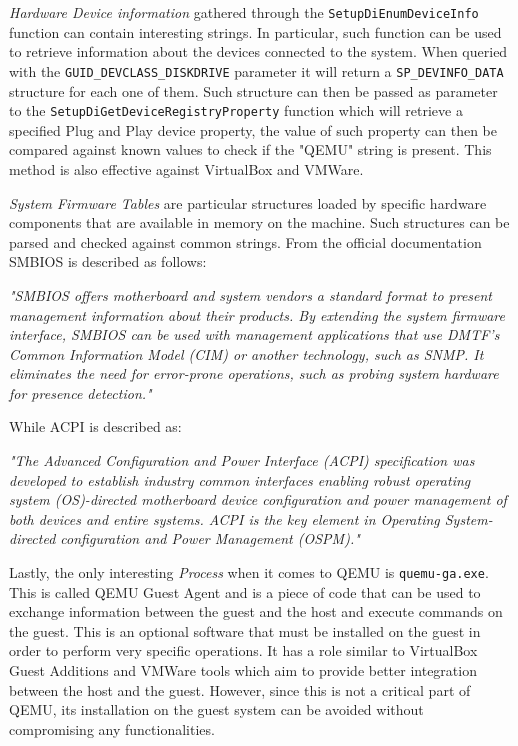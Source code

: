 \textit{Hardware Device information} gathered through the \lstinline{SetupDiEnumDeviceInfo} function can contain interesting strings. In particular, such function can be used to retrieve information about the devices connected to the system. When queried with the \lstinline{GUID_DEVCLASS_DISKDRIVE} parameter it will return a \lstinline{SP_DEVINFO_DATA} structure for each one of them. Such structure can then be passed as parameter to the \lstinline{SetupDiGetDeviceRegistryProperty} function which will retrieve a specified Plug and Play device property, the value of such property can then be compared against known values to check if the "QEMU" string is present. This method is also effective against VirtualBox and VMWare.

\textit{System Firmware Tables} are particular structures loaded by specific hardware components that are available in memory on the machine. Such structures can be parsed and checked against common strings. From the official documentation SMBIOS is described as follows:

\textit{"SMBIOS offers motherboard and system vendors a standard format to present management information about their products. By extending the system firmware interface, SMBIOS can be used with management applications that use DMTF’s Common Information Model (CIM)  or another technology, such as SNMP. It eliminates the need for error-prone operations, such as probing system hardware for presence detection."}\cite{smbios}

While ACPI is described as:

\textit{"The Advanced Configuration and Power Interface (ACPI) specification was developed to establish industry common interfaces enabling robust operating system (OS)-directed motherboard device configuration and power management of both devices and entire systems.  ACPI is the key element in Operating System-directed configuration and Power Management (OSPM)."}\cite{acpi}

Lastly, the only interesting \textit{Process} when it comes to QEMU is \lstinline{quemu-ga.exe}. This is called QEMU Guest Agent and is a piece of code that can be used to exchange information between the guest and the host and execute commands on the guest. This is an optional software that must be installed on the guest in order to perform very specific operations. It has a role similar to VirtualBox Guest Additions and VMWare tools which aim to provide better integration between the host and the guest. However, since this is not a critical part of QEMU, its installation on the guest system can be avoided without compromising any functionalities.  

